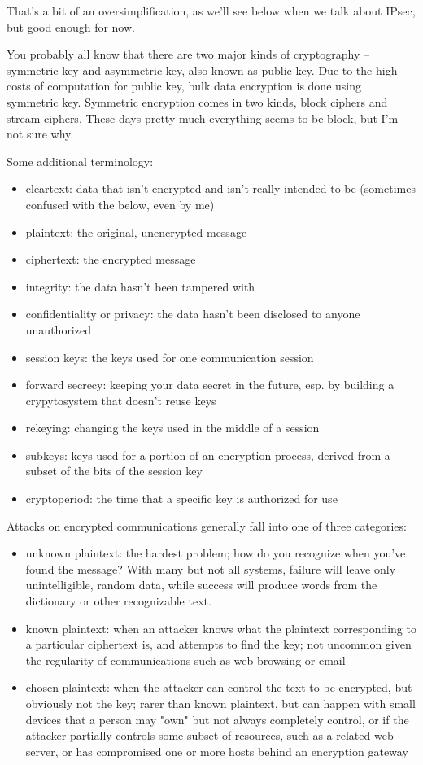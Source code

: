 \documentclass[%
 aip,
 jmp,%
 amsmath,amssymb,
 reprint,%
]{revtex4-1}
\begin{document}
That's a bit of an oversimplification, as we'll see below when we talk
about IPsec, but good enough for now.

You probably all know that there are two major kinds of cryptography
-- symmetric key and asymmetric key, also known as public key.  Due to
the high costs of computation for public key, bulk data encryption is
done using symmetric key.  Symmetric encryption comes in two kinds,
block ciphers and stream ciphers.  These days pretty much everything
seems to be block, but I'm not sure why.

Some additional terminology:

\begin{itemize}
\item cleartext: data that isn't encrypted and isn't really intended to be
  (sometimes confused with the below, even by me)
\item plaintext: the original, unencrypted message
\item ciphertext: the encrypted message
\item integrity: the data hasn't been tampered with
\item confidentiality or privacy: the data hasn't been disclosed to anyone unauthorized
\item session keys: the keys used for one communication session
\item forward secrecy: keeping your data secret in the future, esp. by
  building a crypytosystem that doesn't reuse keys
\item rekeying: changing the keys used in the middle of a session
\item subkeys: keys used for a portion of an encryption process, derived
  from a subset of the bits of the session key
\item cryptoperiod: the time that a specific key is authorized for use
\end{itemize}

Attacks on encrypted communications generally fall into one of three
categories:

\begin{itemize}
\item unknown plaintext: the hardest problem; how do you recognize when
  you've found the message?  With many but not all systems, failure
  will leave only unintelligible, random data, while success will
  produce words from the dictionary or other recognizable text.
\item known plaintext: when an attacker knows what the plaintext
  corresponding to a particular ciphertext is, and attempts to find
  the key; not uncommon given the regularity of communications such as
  web browsing or email
\item chosen plaintext: when the attacker can control the text to be
  encrypted, but obviously not the key; rarer than known plaintext,
  but can happen with small devices that a person may "own" but not
  always completely control, or if the attacker partially controls
  some subset of resources, such as a related web server, or has
  compromised one or more hosts behind an encryption gateway
\end{itemize}
\end{document}
